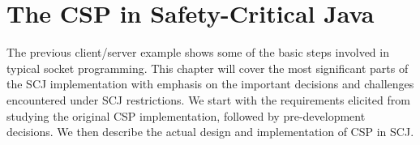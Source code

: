 \chapter{The CSP in Safety-Critical Java}
\label{chapter:cspinscj}
The previous client/server example shows some of the basic steps involved in typical socket programming. This chapter will cover the most significant parts of the SCJ implementation with emphasis on the important decisions and challenges encountered under SCJ restrictions. We start with the requirements elicited from studying the original CSP implementation, followed by pre-development decisions. We then describe the actual design and implementation of CSP in SCJ.